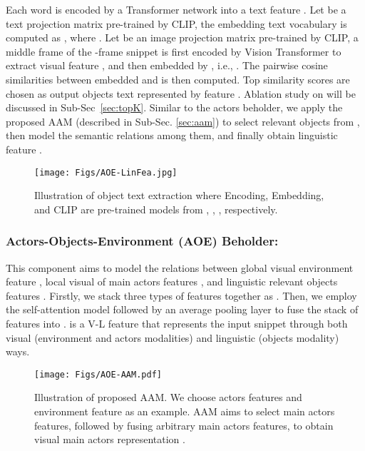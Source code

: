 \documentclass[sn-mathphys]{sn-jnl}
\theoremstyle{thmstyleone}\newtheorem{theorem}{Theorem}\newtheorem{proposition}[theorem]{Proposition}
\theoremstyle{thmstyletwo}\newtheorem{example}{Example}\newtheorem{remark}{Remark}
\theoremstyle{thmstylethree}\newtheorem{definition}{Definition}
\begin{document}
Each word  is encoded by a Transformer network \cite{attention_is_all_you_need} into a text feature . Let  be a text projection matrix pre-trained by CLIP, the embedding text vocabulary is computed as , where . Let  be an image projection matrix pre-trained by CLIP, a middle frame  of the -frame snippet is first encoded by Vision Transformer \cite{dosovitskiy2020image} to extract visual feature , and then embedded by , i.e., . The pairwise cosine similarities between embedded  and  is then computed. Top  similarity scores are chosen as output objects text represented by feature . Ablation study on  will be discussed in Sub-Sec~\ref{sec:topK}. Similar to the actors beholder, we apply the proposed AAM (described in Sub-Sec. \ref{sec:aam}) to select relevant objects from , then model the semantic relations among them, and finally obtain linguistic feature .



\begin{figure}[t]
\centering
  \texttt{[image: Figs/AOE-LinFea.jpg]}
  \caption{Illustration of object text extraction where Encoding, Embedding, and CLIP are pre-trained models from \cite{attention_is_all_you_need}, \cite{dosovitskiy2020image}, \cite{radford2021learning}, respectively.}\label{fig:obj_text}
\end{figure}


\subsubsection{Actors-Objects-Environment (AOE) Beholder:}
\label{subsubsec:aoe}
This component aims to model the relations between global visual environment feature , local visual of main actors features , and linguistic relevant objects features . Firstly, we stack three types of features together as . Then, we employ the self-attention model \cite{attention_is_all_you_need} followed by an average pooling layer to fuse the stack of features  into .  is a V-L feature that represents the input snippet  through both visual (environment and actors modalities) and linguistic (objects modality) ways.

\begin{figure}[t]
\centering
  \texttt{[image: Figs/AOE-AAM.pdf]}
  \caption{Illustration of proposed AAM. We choose actors features  and environment feature  as an example. AAM aims to select main actors features, followed by fusing arbitrary main actors features, to obtain visual main actors representation .}
  \label{fig:AOE-AAM}
\end{figure}
\end{document}
